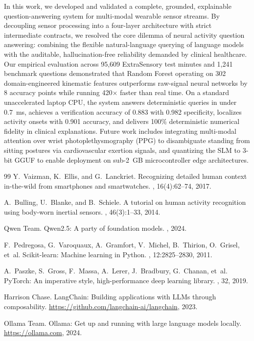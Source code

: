 \documentclass[11pt,a4paper]{article}
\begin{document}
In this work, we developed and validated a complete, grounded, explainable question-answering system for multi-modal wearable sensor streams. By decoupling sensor processing into a four-layer architecture with strict intermediate contracts, we resolved the core dilemma of neural activity question answering: combining the flexible natural-language querying of language models with the auditable, hallucination-free reliability demanded by clinical healthcare. Our empirical evaluation across 95,609 ExtraSensory test minutes and 1,241 benchmark questions demonstrated that Random Forest operating on 302 domain-engineered kinematic features outperforms raw-signal neural networks by 8 accuracy points while running 420$\times$ faster than real time. On a standard unaccelerated laptop CPU, the system answers deterministic queries in under 0.7~ms, achieves a verification accuracy of 0.883 with 0.982 specificity, localizes activity onsets with 0.901 accuracy, and delivers 100\% deterministic numerical fidelity in clinical explanations. Future work includes integrating multi-modal attention over wrist photoplethysmography (PPG) to disambiguate standing from sitting postures via cardiovascular exertion signals, and quantizing the SLM to 3-bit GGUF to enable deployment on sub-2~GB microcontroller edge architectures.

\begin{thebibliography}{99}
\small
{}
Y.~Vaizman, K.~Ellis, and G.~Lanckriet.
\newblock Recognizing detailed human context in-the-wild from smartphones and smartwatches.
, 16(4):62--74, 2017.

A.~Bulling, U.~Blanke, and B.~Schiele.
\newblock A tutorial on human activity recognition using body-worn inertial sensors.
, 46(3):1--33, 2014.


Qwen Team.
\newblock Qwen2.5: A party of foundation models.
, 2024.

F.~Pedregosa, G.~Varoquaux, A.~Gramfort, V.~Michel, B.~Thirion, O.~Grisel, et~al.
\newblock Scikit-learn: Machine learning in Python.
, 12:2825--2830, 2011.

A.~Paszke, S.~Gross, F.~Massa, A.~Lerer, J.~Bradbury, G.~Chanan, et~al.
\newblock PyTorch: An imperative style, high-performance deep learning library.
, 32, 2019.

Harrison Chase.
\newblock LangChain: Building applications with LLMs through composability.
\newblock \url{https://github.com/langchain-ai/langchain}, 2023.

Ollama Team.
\newblock Ollama: Get up and running with large language models locally.
\newblock \url{https://ollama.com}, 2024.
\end{thebibliography}
\end{document}
